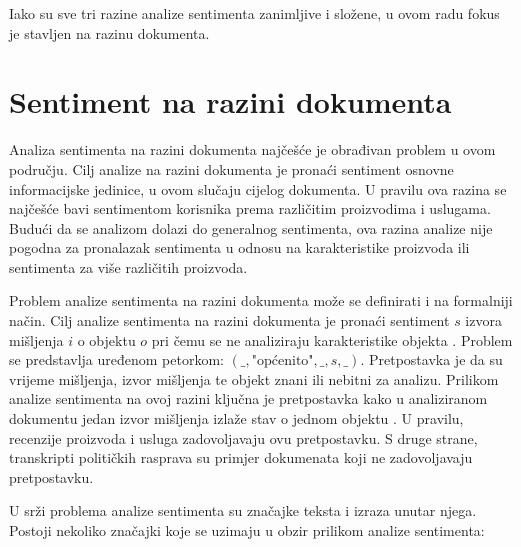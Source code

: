 \documentclass[times, utf8, zavrsni, numeric]{fer}
\begin{document}
Iako su sve tri razine analize sentimenta zanimljive i složene, u ovom radu fokus je stavljen na 
razinu dokumenta.

\section{Sentiment na razini dokumenta} \label{sadoc}
Analiza sentimenta na razini dokumenta najčešće je obrađivan problem u ovom području.
Cilj analize na razini dokumenta je pronaći sentiment osnovne informacijske jedinice, u ovom slučaju
cijelog dokumenta.
U pravilu ova razina se najčešće bavi sentimentom korisnika prema različitim proizvodima i uslugama.
Budući da se analizom dolazi do generalnog sentimenta, ova razina analize nije pogodna za pronalazak
sentimenta u odnosu na karakteristike proizvoda ili sentimenta za više različitih proizvoda.

\par Problem analize sentimenta na razini dokumenta može se definirati i na formalniji način. 
Cilj analize sentimenta na razini dokumenta je pronaći sentiment $s$ izvora mišljenja $i$ 
o objektu $o$ pri čemu se ne analiziraju karakteristike objekta \cite{Liu:2012:SAO:3019323}. 
Problem se predstavlja uređenom petorkom: $(\text{\_}, \text{"općenito"}, \text{\_}, s, \text{\_})$.
Pretpostavka je da su vrijeme mišljenja, izvor mišljenja te objekt znani ili nebitni za analizu.
Prilikom analize sentimenta na ovoj razini ključna je pretpostavka kako u analiziranom dokumentu
jedan izvor mišljenja izlaže stav o jednom objektu \cite{opinion.review.2010}.
U pravilu, recenzije proizvoda i usluga zadovoljavaju ovu pretpostavku.
S druge strane, transkripti političkih rasprava su primjer dokumenata koji ne zadovoljavaju pretpostavku.

\par U srži problema analize sentimenta su značajke teksta i izraza unutar njega.
Postoji nekoliko značajki koje se uzimaju u obzir prilikom analize sentimenta:
\end{document}
